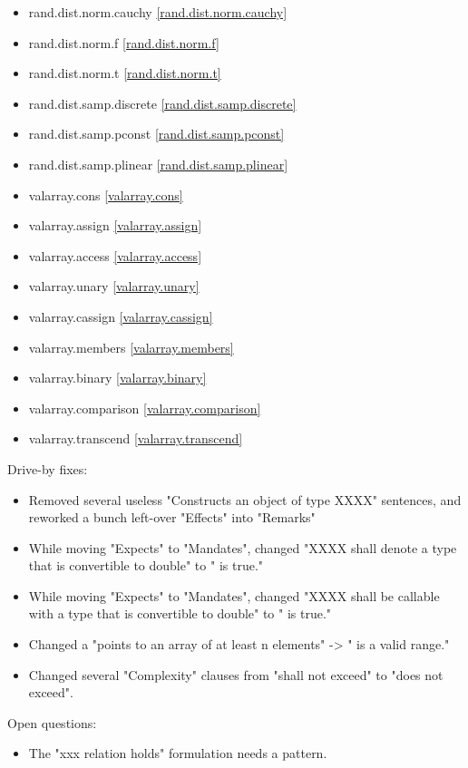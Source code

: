 \begin{multicols}{3}
\begin{itemize}
\item{rand.dist.norm.cauchy}	\ref{rand.dist.norm.cauchy}
\item{rand.dist.norm.f}			\ref{rand.dist.norm.f}
\item{rand.dist.norm.t}			\ref{rand.dist.norm.t}
\item{rand.dist.samp.discrete}	\ref{rand.dist.samp.discrete}
\item{rand.dist.samp.pconst}	\ref{rand.dist.samp.pconst}
\item{rand.dist.samp.plinear}	\ref{rand.dist.samp.plinear}
\item{valarray.cons}			\ref{valarray.cons}
\item{valarray.assign}			\ref{valarray.assign}
\item{valarray.access}			\ref{valarray.access}
\item{valarray.unary}			\ref{valarray.unary}
\item{valarray.cassign}			\ref{valarray.cassign}
\item{valarray.members}			\ref{valarray.members}
\item{valarray.binary}			\ref{valarray.binary}
\item{valarray.comparison}		\ref{valarray.comparison}
\item{valarray.transcend}		\ref{valarray.transcend}
\end{itemize}
\end{multicols}

Drive-by fixes:
\begin{itemize}
\item{Removed several useless "Constructs an object of type XXXX" sentences, and reworked a bunch left-over "Effects" into "Remarks"}
\item{While moving "Expects" to "Mandates", changed "XXXX shall denote a type that is convertible to double" to " is true."}
\item{While moving "Expects" to "Mandates", changed "XXXX shall be callable with a type that is convertible to double" to " is true."}
\item{Changed a "points to an array of at least n elements" -> " is a valid range."}
\item{Changed several "Complexity" clauses from "shall not exceed" to "does not exceed".}
\end{itemize}

Open questions:
\begin{itemize}
\item{The "xxx relation holds" formulation needs a pattern.}
\end{itemize}


